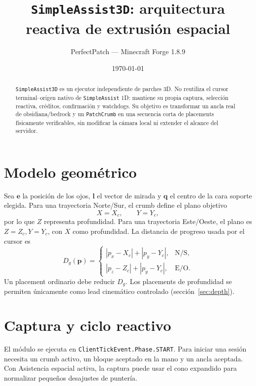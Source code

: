 \documentclass[11pt,a4paper]{article}
\title{\texttt{SimpleAssist3D}: arquitectura reactiva de extrusión espacial}
\author{PerfectPatch --- Minecraft Forge 1.8.9}
\date{\today}
\begin{document}
\maketitle

\begin{abstract}
\texttt{SimpleAssist3D} es un ejecutor independiente de parches 3D. No reutiliza
el cursor terminal--origen nativo de \texttt{SimpleAssist} 1D: mantiene su propia
captura, selección reactiva, créditos, confirmación y watchdogs. Su objetivo es
transformar un ancla real de obsidiana/bedrock y un \texttt{PatchCrumb} en una
secuencia corta de placements físicamente verificables, sin modificar la cámara
local ni extender el alcance del servidor.
\end{abstract}

\tableofcontents

\section{Modelo geométrico}

Sea $\mathbf e$ la posición de los ojos, $\mathbf l$ el vector de mirada y
$\mathbf q$ el centro de la cara soporte elegida. Para una trayectoria Norte/Sur,
el crumb define el plano objetivo
\begin{equation}
  X=X_c,\qquad Y=Y_c,
\end{equation}
por lo que $Z$ representa profundidad. Para una trayectoria Este/Oeste, el plano
es $Z=Z_c, Y=Y_c$, con $X$ como profundidad. La distancia de progreso usada por el
cursor es
\begin{equation}
 D_g(\mathbf p)=
 \begin{cases}
 |p_x-X_c|+|p_y-Y_c|,& \text{N/S},\\
 |p_z-Z_c|+|p_y-Y_c|,& \text{E/O}.
 \end{cases}
\end{equation}
Un placement ordinario debe reducir $D_g$. Los placements de profundidad se
permiten únicamente como lead cinemático controlado (sección~\ref{sec:depth}).

\section{Captura y ciclo reactivo}

El módulo se ejecuta en \texttt{ClientTickEvent.Phase.START}. Para iniciar una
sesión necesita un crumb activo, un bloque aceptado en la mano y un ancla aceptada.
Con Asistencia espacial activa, la captura puede usar el cono expandido para
normalizar pequeños desajustes de puntería.
\end{document}
